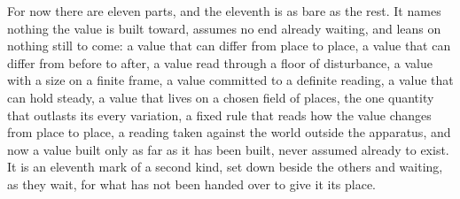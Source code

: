 For now there are eleven parts, and the eleventh is as bare as the rest. It names nothing the value is built toward, assumes no end already waiting, and leans on nothing still to come: a value that can differ from place to place, a value that can differ from before to after, a value read through a floor of disturbance, a value with a size on a finite frame, a value committed to a definite reading, a value that can hold steady, a value that lives on a chosen field of places, the one quantity that outlasts its every variation, a fixed rule that reads how the value changes from place to place, a reading taken against the world outside the apparatus, and now a value built only as far as it has been built, never assumed already to exist. It is an eleventh mark of a second kind, set down beside the others and waiting, as they wait, for what has not been handed over to give it its place.
